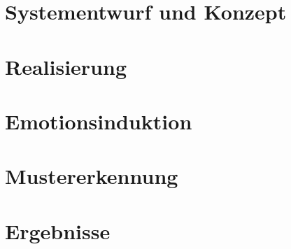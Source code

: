 

\section{Systementwurf und Konzept} \label{systementwurf-sec}



\newpage
\section{Realisierung} \label{realisierung-sec}



\newpage
\section{Emotionsinduktion} \label{emotionsinduktion-sec}



\newpage



\newpage
\section{Mustererkennung} \label{mustererkennung-sec}


\newpage
\section{Ergebnisse} \label{ergenisse-sec}

